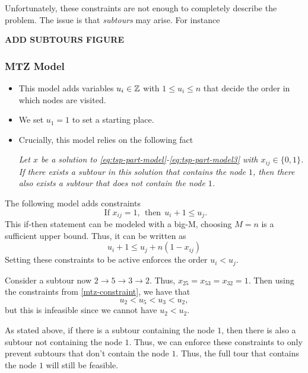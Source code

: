 \documentclass[../open-optimization/open-optimization.tex]{subfiles}
\begin{document}
Unfortunately, these constraints are not enough to completely describe the problem.  The issue is that \emph{subtours} may arise.  For instance
\begin{center}
\textbf{ADD SUBTOURS FIGURE}
\end{center}
\subsubsection{MTZ Model}

\begin{itemize}
\item This model adds variables $u_i \in {\mathbb{Z}}$ with $1 \leq u_i \leq n$ that decide the order in which nodes are visited.
\item We set $u_1 = 1$ to set a starting place.
\item Crucially, this model relies on the following fact\\
\begin{center}
\emph{
Let  $x$ be a solution to \eqref{eq:tsp-part-model}-\eqref{eq:tsp-part-model3} with $x_{ij} \in \{0,1\}$.  If there exists a subtour in this solution that contains the node $1$, then there also exists a subtour that does not contain the node $1$.}
\end{center}
\end{itemize}

The following model adds constraints
\begin{equation}
\text{ If } x_{ij} = 1, \ \ \text{then} \ \ u_i + 1 \leq u_j.
\end{equation}
This if-then statement can be modeled with a big-M, choosing $M = n$ is a sufficient upper bound.  Thus, it can be written as 
\begin{equation}
\label{mtz-constraint}
u_i + 1 \leq u_j + n(1-x_{ij})
\end{equation}
Setting these constraints to be active enforces the order $u_i < u_j$.    

Consider a subtour now  $2 \to 5 \to 3 \to 2$.  Thus, $x_{25} = x_{53} = x_{32} = 1$.  Then using the constraints from \eqref{mtz-constraint}, we have that 
\begin{equation}
u_2 < u_5 < u_3 < u_2,
\end{equation}
but this is infeasible since we cannot have $u_2 < u_2$.  

As stated above, if there is a subtour containing the node $1$, then there is also a subtour not containing the node $1$.  Thus, we can enforce these constraints to only prevent subtours that don't contain the node $1$.  Thus, the full tour that contains the node $1$ will still be feasible.
\end{document}
